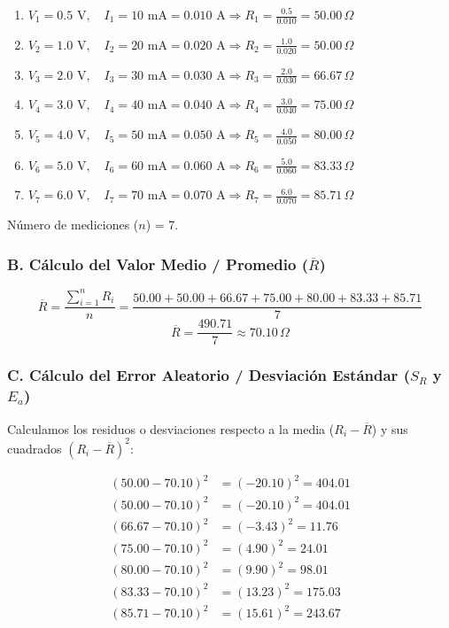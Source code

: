 \documentclass[12pt,a4paper]{article}
\begin{document}
\begin{enumerate}
    \item $V_1 = 0.5\text{ V}, \quad I_1 = 10\text{ mA} = 0.010\text{ A} \Rightarrow R_1 = \frac{0.5}{0.010} = 50.00\,\Omega$
    \item $V_2 = 1.0\text{ V}, \quad I_2 = 20\text{ mA} = 0.020\text{ A} \Rightarrow R_2 = \frac{1.0}{0.020} = 50.00\,\Omega$
    \item $V_3 = 2.0\text{ V}, \quad I_3 = 30\text{ mA} = 0.030\text{ A} \Rightarrow R_3 = \frac{2.0}{0.030} = 66.67\,\Omega$
    \item $V_4 = 3.0\text{ V}, \quad I_4 = 40\text{ mA} = 0.040\text{ A} \Rightarrow R_4 = \frac{3.0}{0.040} = 75.00\,\Omega$
    \item $V_5 = 4.0\text{ V}, \quad I_5 = 50\text{ mA} = 0.050\text{ A} \Rightarrow R_5 = \frac{4.0}{0.050} = 80.00\,\Omega$
    \item $V_6 = 5.0\text{ V}, \quad I_6 = 60\text{ mA} = 0.060\text{ A} \Rightarrow R_6 = \frac{5.0}{0.060} = 83.33\,\Omega$
    \item $V_7 = 6.0\text{ V}, \quad I_7 = 70\text{ mA} = 0.070\text{ A} \Rightarrow R_7 = \frac{6.0}{0.070} = 85.71\,\Omega$
\end{enumerate}
Número de mediciones ($n$) = 7.

\subsubsection*{B. Cálculo del Valor Medio / Promedio ($\overline{R}$)}
\begin{equation}
\overline{R} = \frac{\sum_{i=1}^{n} R_i}{n} = \frac{50.00 + 50.00 + 66.67 + 75.00 + 80.00 + 83.33 + 85.71}{7}
\end{equation}
\begin{equation}
\overline{R} = \frac{490.71}{7} \approx 70.10\,\Omega
\end{equation}

\subsubsection*{C. Cálculo del Error Aleatorio / Desviación Estándar ($S_R$ y $E_a$)}
Calculamos los residuos o desviaciones respecto a la media ($R_i - \overline{R}$) y sus cuadrados $(R_i - \overline{R})^2$:

\begin{align*}
(50.00 - 70.10)^2 &= (-20.10)^2 = 404.01 \\
(50.00 - 70.10)^2 &= (-20.10)^2 = 404.01 \\
(66.67 - 70.10)^2 &= (-3.43)^2 = 11.76 \\
(75.00 - 70.10)^2 &= (4.90)^2 = 24.01 \\
(80.00 - 70.10)^2 &= (9.90)^2 = 98.01 \\
(83.33 - 70.10)^2 &= (13.23)^2 = 175.03 \\
(85.71 - 70.10)^2 &= (15.61)^2 = 243.67
\end{align*}
\end{document}
